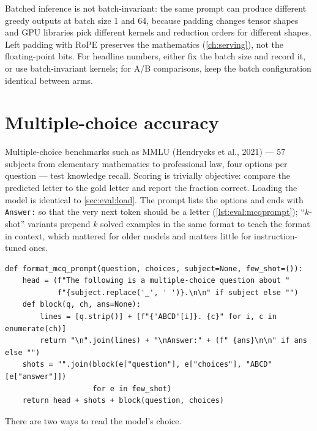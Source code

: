 \begin{systemslens}
Batched inference is not batch-invariant: the same prompt can produce different greedy outputs at
batch size 1 and 64, because padding changes tensor shapes and GPU libraries pick different
kernels and reduction orders for different shapes. Left padding with RoPE preserves the
mathematics (\cref{ch:serving}), not the floating-point bits. For headline numbers, either fix the
batch size and record it, or use batch-invariant kernels; for A/B comparisons, keep the batch
configuration identical between arms.
\end{systemslens}

\section{Multiple-choice accuracy}\label{sec:eval:mcq}


Multiple-choice benchmarks such as MMLU (Hendrycks et al., 2021) --- 57 subjects from
elementary mathematics to professional law, four options per question --- test knowledge recall.
Scoring is trivially objective: compare the predicted letter to the gold letter and report the
fraction correct. Loading the model is identical to \cref{sec:eval:load}. The prompt lists the
options and ends with \texttt{Answer:} so that the very next token should be a letter
(\cref{lst:eval:mcqprompt}); ``$k$-shot'' variants prepend $k$ solved examples in the same format
to teach the format in context, which mattered for older models and matters little for
instruction-tuned ones.

\begin{lstlisting}[caption={An MMLU-style prompt that ends where a letter should follow.},label={lst:eval:mcqprompt}]
def format_mcq_prompt(question, choices, subject=None, few_shot=()):
    head = (f"The following is a multiple-choice question about "
            f"{subject.replace('_', ' ')}.\n\n" if subject else "")
    def block(q, ch, ans=None):
        lines = [q.strip()] + [f"{'ABCD'[i]}. {c}" for i, c in enumerate(ch)]
        return "\n".join(lines) + "\nAnswer:" + (f" {ans}\n\n" if ans else "")
    shots = "".join(block(e["question"], e["choices"], "ABCD"[e["answer"]])
                    for e in few_shot)
    return head + shots + block(question, choices)
\end{lstlisting}

There are two ways to read the model's choice.

